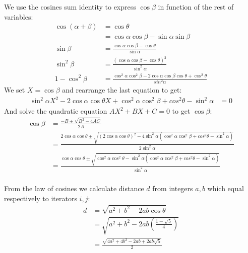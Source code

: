 \documentclass[11pt]{article}
\begin{document}
We use the cosines sum identity to express $\cos\beta$ in function of the rest of variables:
\begin{align}
\cos(\alpha + \beta) &= \cos\theta\\
 &= \cos\alpha\cos\beta - \sin\alpha\sin\beta\\
\sin\beta &= \frac{\cos\alpha\cos\beta - \cos\theta}{\sin\alpha}\\
\sin^2\beta &= \frac{(\cos\alpha\cos\beta - \cos\theta)^2}{\sin^2\alpha}\\
1 - \cos^2\beta &= \frac{\cos^2\alpha\cos^2\beta - 2\cos\alpha\cos\beta\cos\theta + \cos^2\theta}{sin^2\alpha}
\end{align}
We set $X = \cos\beta$ and rearrange the last equation to get:
\begin{align}
\sin^2\alpha X^2 - 2\cos\alpha\cos\theta X + \cos^2\alpha\cos^2\beta + cos^2\theta - \sin^2\alpha &= 0
\end{align}
And solve the quadratic equation $AX^2 + BX + C = 0$ to get $\cos\beta$:
\begin{align}
\cos\beta &= \frac{-B \pm \sqrt{B^2 - 4AC}}{2A}\nonumber\\
 &= \frac{2\cos\alpha\cos\theta \pm 
 \sqrt{(2\cos\alpha\cos\theta)^2 - 4\sin^2\alpha(\cos^2\alpha\cos^2\beta + cos^2\theta - \sin^2\alpha)}}
 {2\sin^2\alpha}\nonumber\\
 &= \frac{\cos\alpha\cos\theta \pm 
 \sqrt{\cos^2\alpha\cos^2\theta - \sin^2\alpha(\cos^2\alpha\cos^2\beta + cos^2\theta - \sin^2\alpha)}}
 {\sin^2\alpha}\nonumber\\
\end{align}













From the law of cosines we calculate distance $d$ from integers $a,b$ which equal respectively to
iterators $i,j$:
\begin{align}
d &= \sqrt{a^2 + b^2 - 2ab\cos\theta} \nonumber\\
 &= \sqrt{a^2 + b^2 - 2ab\left(\frac{1-\sqrt{5}}{4}\right)} \nonumber\\
 &= \frac{\sqrt{4a^2 + 4b^2 - 2ab +2ab\sqrt{5}}}{2}
\end{align}
\end{document}
